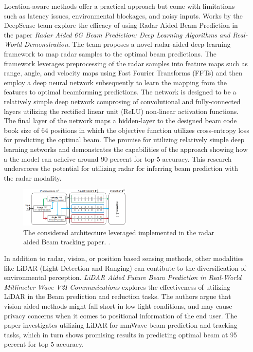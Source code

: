 Location-aware methods offer a practical approach but come with limitations such as latency issues, environmental blockages, and noisy inputs. Works by the DeepSense team explore the efficacy of using Radar Aided Beam Prediction in the paper \textit{Radar Aided 6G Beam Prediction: Deep Learning Algorithms and Real-World Demonstration}. The team proposes a novel radar-aided deep learning framework to map radar samples to the optimal beam predictions. The framework leverages preprocessing of the radar samples into feature maps such as range, angle, and velocity maps using Fast Fourier Transforms (FFTs) and then employ a deep neural network subsequently to learn the mapping from the features to optimal beamforming predictions. The network is designed to be a relatively simple deep network comprosing of convolutional and fully-connected layers utilizing the rectified linear unit (ReLU) non-linear activation functions. The final layer of the network maps a hidden-layer to the designed beam code book size of 64 positions in which the objective function utilizes cross-entropy loss for predicting the optimal beam. The promise for utilizing relatively simple deep learning networks and demonstrates the capabilities of the approach showing how a the model can acheive around 90 percent for top-5 accuracy. This research underscores the potential for utilizing radar for inferring beam prediction with the radar modality. \cite{demirhan2022radar} 

\begin{figure}[h!]
  \centering
  \includegraphics[width=0.5\textwidth]{Images/Literature_Review/demirhan2022radar_architecture.png}
  \caption{The considered architecture leveraged implemented in the radar aided Beam tracking paper. \cite{jiang2022computer}.}
  \label{fig:my_label}
\end{figure}

In addition to radar, vision, or position based sensing methods, other modalities like LiDAR (Light Detection and Ranging) can contibute to the diversification of environmental perception. \textit{LiDAR Aided Future Beam Prediction in Real-World Millimeter Wave V2I Communications} explores the effectiveness of utilizing LiDAR in the Beam prediction and reduction tasks. The authors argue that vision-aided methods might fall short in low light conditions, and may cause privacy concerns when it comes to positional information of the end user. The paper investigates utilizing LiDAR for mmWave beam prediction and tracking tasks, which in turn shows promising results in predicting optimal beam at 95 percent for top 5 accuracy.  

